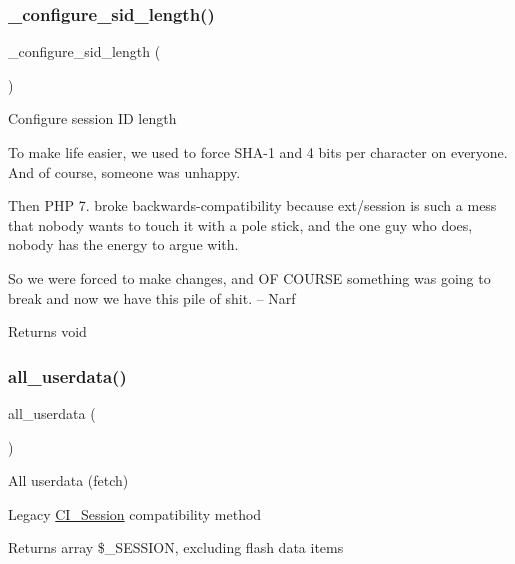 \subsubsection{\texorpdfstring{\+\_\+configure\+\_\+sid\+\_\+length()}{\_configure\_sid\_length()}}
{\footnotesize\ttfamily \+\_\+configure\+\_\+sid\+\_\+length (\begin{DoxyParamCaption}{ }\end{DoxyParamCaption})\hspace{0.3cm}{\ttfamily [protected]}}

Configure session ID length

To make life easier, we used to force S\+H\+A-\/1 and 4 bits per character on everyone. And of course, someone was unhappy.

Then P\+HP 7. broke backwards-\/compatibility because ext/session is such a mess that nobody wants to touch it with a pole stick, and the one guy who does, nobody has the energy to argue with.

So we were forced to make changes, and OF C\+O\+U\+R\+SE something was going to break and now we have this pile of shit. -- Narf

\begin{DoxyReturn}{Returns}
void 
\end{DoxyReturn}
\mbox{\label{class_c_i___session_a974fa60ddc074b14ffcc78ef9902bc5c}} 
\subsubsection{\texorpdfstring{all\+\_\+userdata()}{all\_userdata()}}
{\footnotesize\ttfamily all\+\_\+userdata (\begin{DoxyParamCaption}{ }\end{DoxyParamCaption})}

All userdata (fetch)

Legacy \mbox{\hyperlink{class_c_i___session}{C\+I\+\_\+\+Session}} compatibility method

\begin{DoxyReturn}{Returns}
array \$\+\_\+\+S\+E\+S\+S\+I\+ON, excluding flash data items 
\end{DoxyReturn}
\mbox{\label{class_c_i___session_acc27ddf9dd242d2c887eca2504136cff}} 
